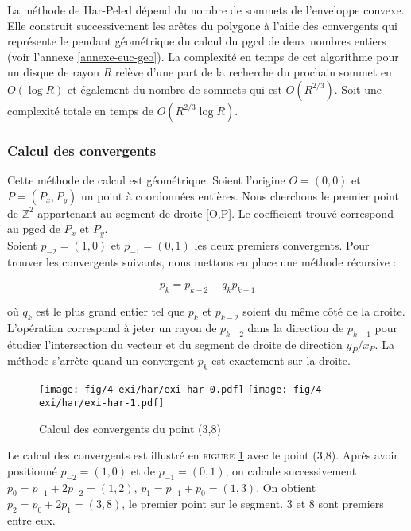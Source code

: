 La méthode de Har-Peled dépend du nombre de sommets de l'enveloppe convexe. Elle construit successivement les arêtes du polygone à l'aide des convergents qui représente le pendant géométrique du calcul du pgcd de deux nombres entiers (voir l'annexe \ref{annexe-euc-geo}). La complexité en temps de cet algorithme pour un disque de rayon $R$ relève d'une part de la recherche du prochain sommet en $O(\log R)$ et également du nombre de sommets qui est $O(R^{2/3})$. Soit une complexité totale en temps de $O( R^{2/3} \log R)$.

\subsubsection{Calcul des convergents}

Cette méthode de calcul est géométrique. Soient l’origine $O=(0,0)$ et $P = (P_x, P_y)$ un point à coordonnées entières. Nous cherchons le premier point de $\mathbb{Z}^{2}$ appartenant au segment de droite [O,P]. Le coefficient trouvé correspond au pgcd de $P_x$ et $P_y$.\\

Soient $p_{-2} = (1,0)$ et $p_{-1} = (0,1)$ les deux premiers convergents. Pour trouver les convergents suivants, nous mettons en place une méthode récursive :

$$p_{k} = p_{k-2} + q_k p_{k-1}$$

où $q_k$ est le plus grand entier tel que $p_{k}$ et $p_{k-2}$ soient du même côté de la droite.\\

L'opération correspond à jeter un rayon de $p_{k-2}$ dans la direction de $p_{k-1}$ pour étudier l’intersection du vecteur et du segment de droite de direction $y_P / x_P$. La méthode s’arrête quand un convergent $p_{k}$ est exactement sur la droite.\\

\begin{figure}[H]
  \centering
  \texttt{[image: fig/4-exi/har/exi-har-0.pdf]}
  \texttt{[image: fig/4-exi/har/exi-har-1.pdf]}
  \caption{Calcul des convergents du point (3,8)}
  \label{fig:conv}
\end{figure}

Le calcul des convergents est illustré en \textsc{figure} \ref{fig:conv} avec le point (3,8). Après avoir positionné $p_{-2} = (1,0)$ et de $p_{-1} = (0,1)$, on calcule successivement $p_{0} = p_{-1} + 2p_{-2} = (1,2)$,  $p_{1} = p_{-1} + p_{0} = (1,3)$. On obtient $p_{2} = p_{0} + 2p_{1} = (3,8)$, le premier point sur le segment. 3 et 8 sont premiers entre eux.

